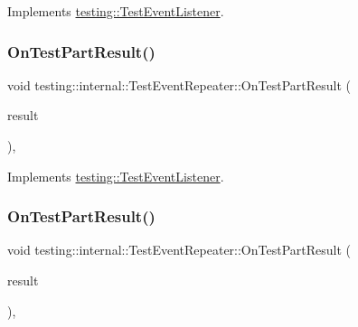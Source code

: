 Implements \mbox{\hyperlink{classtesting_1_1_test_event_listener_a054f8705c883fa120b91473aff38f2ee}{testing\+::\+Test\+Event\+Listener}}.

\mbox{\label{classtesting_1_1internal_1_1_test_event_repeater_aaf15a326277f2b2900f8b3624fb27562}} 
\subsubsection{\texorpdfstring{OnTestPartResult()}{OnTestPartResult()}\hspace{0.1cm}{\footnotesize\ttfamily [2/3]}}
{\footnotesize\ttfamily void testing\+::internal\+::\+Test\+Event\+Repeater\+::\+On\+Test\+Part\+Result (\begin{DoxyParamCaption}\item[{const Test\+Part\+Result \&}]{result }\end{DoxyParamCaption})\hspace{0.3cm}{\ttfamily [override]}, {\ttfamily [virtual]}}



Implements \mbox{\hyperlink{classtesting_1_1_test_event_listener_a054f8705c883fa120b91473aff38f2ee}{testing\+::\+Test\+Event\+Listener}}.

\mbox{\label{classtesting_1_1internal_1_1_test_event_repeater_aaf15a326277f2b2900f8b3624fb27562}} 
\subsubsection{\texorpdfstring{OnTestPartResult()}{OnTestPartResult()}\hspace{0.1cm}{\footnotesize\ttfamily [3/3]}}
{\footnotesize\ttfamily void testing\+::internal\+::\+Test\+Event\+Repeater\+::\+On\+Test\+Part\+Result (\begin{DoxyParamCaption}\item[{const Test\+Part\+Result \&}]{result }\end{DoxyParamCaption})\hspace{0.3cm}{\ttfamily [override]}, {\ttfamily [virtual]}}



